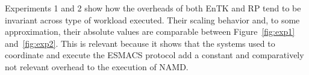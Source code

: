 Experiments 1 and 2 show how the overheads of both EnTK and RP tend to be
invariant across type of workload executed. Their scaling behavior and, to
some approximation, their absolute values are comparable between
Figure~\ref{fig:exp1} and~\ref{fig:exp2}. This is relevant because it shows
that the systems used to coordinate and execute the ESMACS protocol add a
constant and comparatively not relevant overhead to the execution of NAMD\@.







